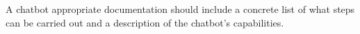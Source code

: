 \documentclass[a4paper,10pt]{article}
\begin{document}
A chatbot appropriate documentation should include a concrete list of what steps can be carried out and a description of the chatbot’s capabilities.



\medskip


\end{document}

